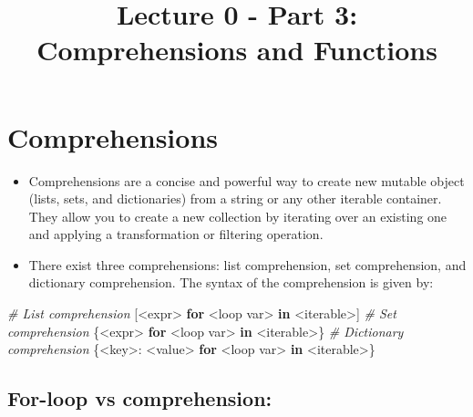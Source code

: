 \documentclass[11pt]{article}
\title{Lecture 0 - Part 3: Comprehensions and Functions}
\date{}
\newenvironment{Shaded}{}{}
\newcommand{\KeywordTok}[1]{\textcolor[rgb]{0.00,0.44,0.13}{\textbf{{#1}}}}
\newcommand{\CommentTok}[1]{\textcolor[rgb]{0.38,0.63,0.69}{\textit{{#1}}}}
\newcommand{\NormalTok}[1]{{#1}}
\newcommand{\ControlFlowTok}[1]{\textcolor[rgb]{0.00,0.44,0.13}{\textbf{{#1}}}}
\newcommand{\OperatorTok}[1]{\textcolor[rgb]{0.40,0.40,0.40}{{#1}}}
\begin{document}
    
    \maketitle
    
    

    
    \hypertarget{comprehensions}{%
\section{Comprehensions}\label{comprehensions}}

\begin{itemize}
\item
  Comprehensions are a concise and powerful way to create new mutable
  object (lists, sets, and dictionaries) from a string or any other
  iterable container. They allow you to create a new collection by
  iterating over an existing one and applying a transformation or
  filtering operation.
\item
  There exist three comprehensions: list comprehension, set
  comprehension, and dictionary comprehension. The syntax of the
  comprehension is given by:
\end{itemize}

\begin{Shaded}
\begin{Highlighting}[]
\CommentTok{\# List comprehension}
\NormalTok{[}\OperatorTok{\textless{}}\NormalTok{expr}\OperatorTok{\textgreater{}} \ControlFlowTok{for} \OperatorTok{\textless{}}\NormalTok{loop var}\OperatorTok{\textgreater{}} \KeywordTok{in} \OperatorTok{\textless{}}\NormalTok{iterable}\OperatorTok{\textgreater{}}\NormalTok{]}
\CommentTok{\# Set comprehension}
\NormalTok{\{}\OperatorTok{\textless{}}\NormalTok{expr}\OperatorTok{\textgreater{}} \ControlFlowTok{for} \OperatorTok{\textless{}}\NormalTok{loop var}\OperatorTok{\textgreater{}} \KeywordTok{in} \OperatorTok{\textless{}}\NormalTok{iterable}\OperatorTok{\textgreater{}}\NormalTok{\}}
\CommentTok{\# Dictionary comprehension}
\NormalTok{\{}\OperatorTok{\textless{}}\NormalTok{key}\OperatorTok{\textgreater{}}\NormalTok{: }\OperatorTok{\textless{}}\NormalTok{value}\OperatorTok{\textgreater{}} \ControlFlowTok{for} \OperatorTok{\textless{}}\NormalTok{loop var}\OperatorTok{\textgreater{}} \KeywordTok{in} \OperatorTok{\textless{}}\NormalTok{iterable}\OperatorTok{\textgreater{}}\NormalTok{\}}
\end{Highlighting}
\end{Shaded}

\hypertarget{for-loop-vs-comprehension}{%
\subsection{For-loop vs
comprehension:}\label{for-loop-vs-comprehension}}
\end{document}
